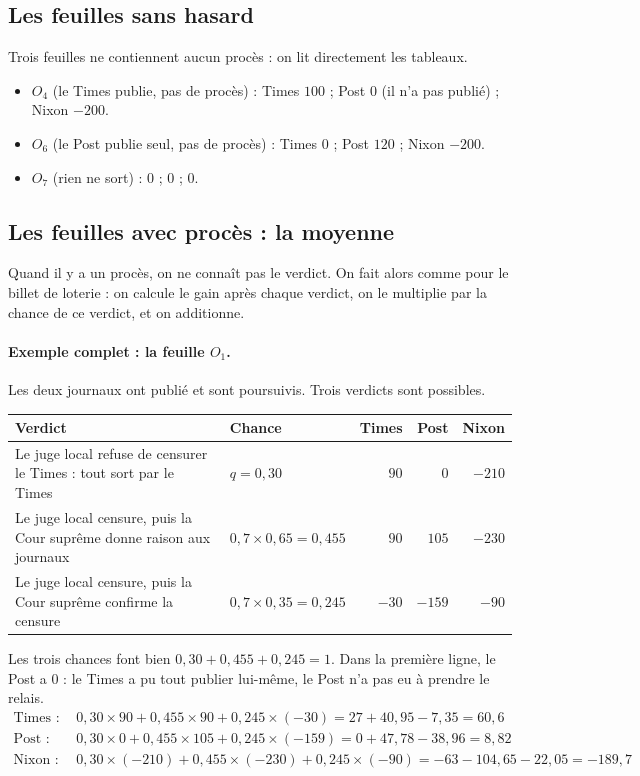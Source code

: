 \documentclass[11pt,a4paper]{article}
\theoremstyle{definition}
\begin{document}
\subsection{Les feuilles sans hasard}
Trois feuilles ne contiennent aucun procès : on lit directement les tableaux.
\begin{itemize}[leftmargin=*,itemsep=1pt]
\item $O_4$ (le Times publie, pas de procès) : Times $100$ ; Post $0$ (il n'a pas publié) ; Nixon $-200$.
\item $O_6$ (le Post publie seul, pas de procès) : Times $0$ ; Post $120$ ; Nixon $-200$.
\item $O_7$ (rien ne sort) : $0$ ; $0$ ; $0$.
\end{itemize}

\subsection{Les feuilles avec procès : la moyenne}
Quand il y a un procès, on ne connaît pas le verdict. On fait alors comme pour le billet de loterie : on calcule le gain après chaque verdict, on le multiplie par la chance de ce verdict, et on additionne.

\paragraph{Exemple complet : la feuille $O_1$.} Les deux journaux ont publié et sont poursuivis. Trois verdicts sont possibles.
\begin{center}
\small
\begin{tabularx}{\textwidth}{@{}>{\raggedright\arraybackslash}Xlrrr@{}}
\toprule
Verdict & Chance & Times & Post & Nixon \\
\midrule
Le juge local refuse de censurer le Times : tout sort par le Times & $q=0,30$ & $90$ & $0$ & $-210$ \\
Le juge local censure, puis la Cour suprême donne raison aux journaux & $0,7\times0,65=0,455$ & $90$ & $105$ & $-230$ \\
Le juge local censure, puis la Cour suprême confirme la censure & $0,7\times0,35=0,245$ & $-30$ & $-159$ & $-90$ \\
\bottomrule
\end{tabularx}
\end{center}
Les trois chances font bien $0,30+0,455+0,245=1$. Dans la première ligne, le Post a $0$ : le Times a pu tout publier lui-même, le Post n'a pas eu à prendre le relais.
\begin{align*}
\text{Times :}\quad & 0,30\times90+0,455\times90+0,245\times(-30)=27+40,95-7,35=60,6\\
\text{Post :}\quad & 0,30\times0+0,455\times105+0,245\times(-159)=0+47,78-38,96=8,82\\
\text{Nixon :}\quad & 0,30\times(-210)+0,455\times(-230)+0,245\times(-90)=-63-104,65-22,05=-189,7
\end{align*}
\end{document}
